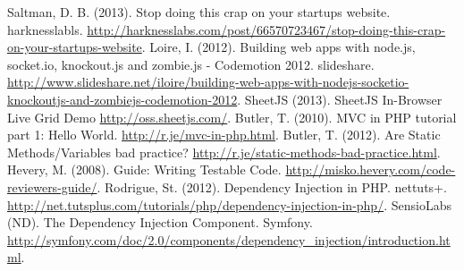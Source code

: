 \begin{thebibliography}{9}
 Saltman, D. B. (2013). Stop doing this crap on your
startups website. harknesslabls.
\url{http://harknesslabs.com/post/66570723467/stop-doing-this-crap-on-your-startups-website}.
 Loire, I. (2012). Building web apps with node.js, socket.io,
knockout.js and zombie.js - Codemotion 2012. slideshare.
\url{http://www.slideshare.net/iloire/building-web-apps-with-nodejs-socketio-knockoutjs-and-zombiejs-codemotion-2012}.
 SheetJS (2013). SheetJS In-Browser Live Grid Demo
\url{http://oss.sheetjs.com/}.
 Butler, T. (2010). MVC in PHP tutorial part 1: Hello
World. \url{http://r.je/mvc-in-php.html}.
 Butler, T. (2012). Are Static Methods/Variables bad
practice? \url{http://r.je/static-methods-bad-practice.html}.
 Hevery, M. (2008). Guide: Writing Testable
Code. \url{http://misko.hevery.com/code-reviewers-guide/}.
 Rodrigue, St. (2012).  Dependency Injection in
PHP. nettuts+.
\url{http://net.tutsplus.com/tutorials/php/dependency-injection-in-php/}.
 SensioLabs (ND). The Dependency Injection
Component. Symfony.
\url{http://symfony.com/doc/2.0/components/dependency_injection/introduction.html}.
\end{thebibliography}
